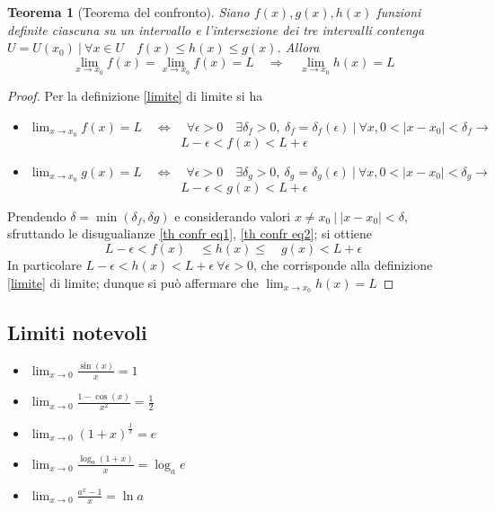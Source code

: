 \documentclass[]{report}
\theoremstyle{definition}
\theoremstyle{remark}
\theoremstyle{plain}
\newtheorem{theor}{Teorema}[chapter]
\numberwithin{equation}{chapter}
\begin{document}
\begin{theor}[Teorema del confronto]\label{th confr}
	Siano $f(x), g(x), h(x)$ funzioni definite ciascuna su un intervallo e l'intersezione dei tre intervalli contenga $U=U(x_{0}) \ | \ \forall x \in U \quad f(x)\leq h(x) \leq g(x)$. Allora
	$$\lim_{x \to x_{0}}f(x)=\lim_{x \to x_{0}}f(x)=L \quad \Longrightarrow \quad \lim_{x \to x_{0}}h(x)=L$$ 
\end{theor}
\begin{proof}
	Per la definizione \ref{limite} di limite si ha
	\begin{itemize}
		\item $\lim_{x\to x_{0}} f(x)=L \quad \Leftrightarrow \quad \forall \epsilon > 0 \quad \exists \delta_{f} > 0 ,\ \delta_{f} = \delta_{f} (\epsilon ) \ | \ \forall x, 0<|x-x_{0}|<\delta_{f} \rightarrow$
		\begin{equation}\label{th confr eq1}
			L-\epsilon<f(x)<L+\epsilon
		\end{equation}
		\item $\lim_{x\to x_{0}} g(x)=L \quad \Leftrightarrow \quad \forall \epsilon > 0 \quad \exists \delta_{g} > 0 ,\ \delta_{g} = \delta_{g} (\epsilon ) \ | \ \forall x, 0<|x-x_{0}|<\delta_{g} \rightarrow$
		\begin{equation}\label{th confr eq2}
			L-\epsilon<g(x)<L+\epsilon
		\end{equation}
	\end{itemize}
	Prendendo $\delta=\min(\delta_{f},\delta{g})$ e considerando valori $x \neq x_{0} \ | \ |x-x_{0}|<\delta$, sfruttando le disugualianze \eqref{th confr eq1}, \eqref{th confr eq2}; si ottiene
		$$L-\epsilon <f(x) \quad  \leq h(x) \leq \quad g(x) < L + \epsilon$$
		In particolare $L-\epsilon<h(x)<L+\epsilon \ \forall \epsilon>0$, che corrisponde alla definizione \ref{limite} di limite; dunque si pu\`{o} affermare che $\lim_{x \to x_{0}}h(x)=L$
\end{proof}

\subsection{Limiti notevoli}

\begin{itemize}
	\item $\displaystyle \lim_{x \to 0} \frac{\sin(x)}{x} = 1$
	\item $\displaystyle \lim_{x \to 0} \frac{1 - \cos(x)}{x^2} = \frac{1}{2}$
	\item $\displaystyle \lim_{x \to 0} (1+x)^{\frac{1}{x}} = \mathit{e}$
	\item $\displaystyle \lim_{x \to 0} \frac{\log_{a}(1+x)}{x} = \log_{a}\mathit{e}$
	\item $\displaystyle \lim_{x \to 0} \frac{a^x-1}{x} = \ln a$
\end{itemize}
\end{document}
